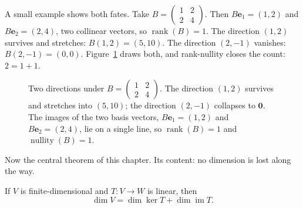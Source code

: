 A small example shows both fates. Take
$B=\begin{pmatrix}1&2\\2&4\end{pmatrix}$. Then $B\mathbf{e}_{1}=(1,2)$ and
$B\mathbf{e}_{2}=(2,4)$, two collinear vectors, so $\operatorname{rank}(B)=1$. The direction $(1,2)$
survives and stretches: $B(1,2)=(5,10)$. The direction $(2,-1)$ vanishes: $B(2,-1)=(0,0)$.
Figure~\ref{fig:arah} draws both, and rank-nullity closes the count: $2=1+1$.

\begin{figure}[htbp]
\centering
{}
\caption{Two directions under $B=\begin{pmatrix}1&2\\2&4\end{pmatrix}$. The direction $(1,2)$
survives and stretches into $(5,10)$; the direction $(2,-1)$ collapses to $\mathbf{0}$. The
images of the two basis vectors,
$B\mathbf{e}_{1}=(1,2)$ and $B\mathbf{e}_{2}=(2,4)$, lie on a single line, so
$\operatorname{rank}(B)=1$ and $\operatorname{nullity}(B)=1$.}
\label{fig:arah}
\end{figure}

Now the central theorem of this chapter. Its content: no dimension is lost along the way.

\begin{teorema}
If $V$ is finite-dimensional and $T\colon V\to W$ is linear, then
\[
  \dim V=\dim\ker T+\dim\operatorname{im}T .
\]
\end{teorema}

